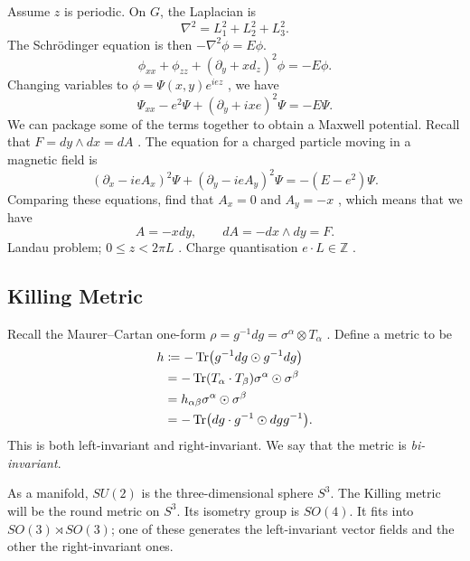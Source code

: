 
Assume $z$ is periodic.
On $G$, the Laplacian is
\begin{equation}
  \nabla^2 = L_1^2 + L_2^2 + L_3^2.
\end{equation}
The Schrödinger equation is then $-\nabla^2 \phi = E \phi$. 
\begin{equation}
  \phi_{xx} + \phi_{zz} + (\partial_y + x d_z)^2 \phi = -E \phi.
\end{equation}
Changing variables to $\phi = \Psi (x, y) e^{i e z}$ , we have
\begin{equation}
  \Psi_{xx} - e^2 \Psi + (\partial_y + i x e)^2 \Psi = -E \Psi.
\end{equation}
We can package some of the terms together to obtain a Maxwell potential.
Recall that $F = dy \wedge dx = dA$ .
The equation for a charged particle moving in a magnetic field is
\begin{equation}
  (\partial_x - i e A_x)^2 \Psi + (\partial_y - i e A_y)^2 \Psi = -(E - e^2)\Psi.
\end{equation}
Comparing these equations, find that $A_x = 0$  and $A_y = -x$ , which means that we have
\begin{equation}
  A = -x dy, \qquad dA = -dx \wedge dy = F.
\end{equation}
Landau problem; $0 \leq z < 2 \pi L$ .
Charge quantisation $e \cdot L \in \mathbb{Z}$ .

\subsection{Killing Metric}%
\label{sub:killing_metric}

Recall the Maurer--Cartan one-form $\rho = g^{-1} d g = \sigma^{\alpha} \otimes T_{\alpha}$ .
Define a metric to be
\begin{align}
  h &\coloneqq -\Tr(g^{-1} dg \odot g^{-1} dg) \\
    &= -\Tr(T_{\alpha} \cdot T_{\beta}) \sigma^{\alpha} \odot \sigma^{\beta} \\
    &= h_{\alpha\beta} \sigma^{\alpha} \odot \sigma^{\beta} \\
    &= -\Tr(dg \cdot g^{-1} \odot dg g^{-1}).
\end{align}
This is both left-invariant and right-invariant. We say that the metric is \emph{bi-invariant}.

\begin{example}[$G = SU(2)$]
  As a manifold, $SU(2)$ is the three-dimensional sphere $S^3$. The Killing metric will be the round metric on $S^3$.
  Its isometry group is $SO(4)$. It fits into $SO(3) \rtimes SO(3)$; one of these generates the left-invariant vector fields and the other the right-invariant ones.
\end{example}

